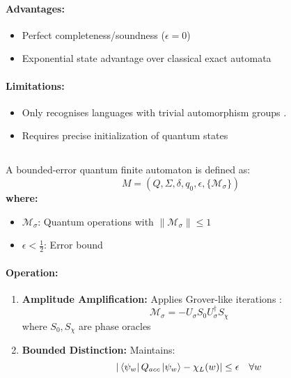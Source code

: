 \paragraph{Advantages:}
\begin{itemize}
    \item Perfect completeness/soundness ($\epsilon = 0$)
    \item Exponential state advantage over classical exact automata
\end{itemize}

\paragraph{Limitations:}
\begin{itemize}
    \item Only recognises languages with trivial automorphism groups \cite{brodsky2001}.
    \item Requires precise initialization of quantum states
\end{itemize}

\subsection{}
\label{subsec:beqfa}

\begin{definition}
A bounded-error quantum finite automaton is defined as:
\[
M = (Q, \Sigma, \delta, q_0, \epsilon, \{\mathcal{M}_\sigma\})
\]
\textbf{where:}
\begin{itemize}
    \item $\mathcal{M}_\sigma$: Quantum operations with $\|\mathcal{M}_\sigma\| \leq 1$
    \item $\epsilon < \frac{1}{2}$: Error bound
\end{itemize}
\end{definition}

\paragraph{Operation:}
\begin{enumerate}
    \item \textbf{Amplitude Amplification:} Applies Grover-like iterations \cite{grover1996fast, ambainis2002quantum}:
    \[
    \mathcal{M}_\sigma = -U_\sigma S_0 U_\sigma^\dagger S_\chi
    \]
    where $S_0, S_\chi$ are phase oracles
    \item \textbf{Bounded Distinction:} Maintains:
    \[
    |\bra{\psi_w}Q_{acc}\ket{\psi_w} - \chi_L(w)| \leq \epsilon \quad \forall w
    \]
\end{enumerate}

